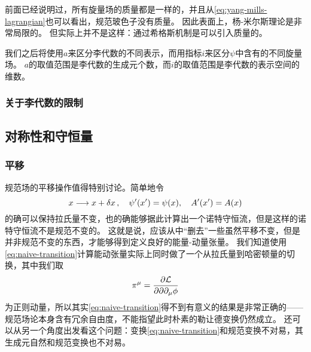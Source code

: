 前面已经说明过，所有旋量场的质量都是一样的，并且从\eqref{eq:yang-mills-lagrangian}也可以看出，规范玻色子没有质量。
因此表面上，杨-米尔斯理论是非常局限的。
但实际上并不是这样：通过希格斯机制是可以引入质量的。

我们之后将使用$a$来区分李代数的不同表示，而用指标$i$来区分$\psi$中含有的不同旋量场。
$a$的取值范围是李代数的生成元个数，而$i$的取值范围是李代数的表示空间的维数。

\subsubsection{关于李代数的限制}


\subsection{对称性和守恒量}

\subsubsection{平移}\label{sec:transition}

规范场的平移操作值得特别讨论。简单地令
\begin{equation}
    x \longrightarrow x + \var{x}, \quad \psi'(x') = \psi(x), \quad A'(x') = A(x)
    \label{eq:naive-transition}
\end{equation}
的确可以保持拉氏量不变，也的确能够据此计算出一个诺特守恒流，但是这样的诺特守恒流不是规范不变的。
这就是说，应该从中“删去”一些虽然平移不变，但是并非规范不变的东西，才能够得到定义良好的能量-动量张量。
我们知道使用\eqref{eq:naive-transition}计算能动张量实际上同时做了一个从拉氏量到哈密顿量的切换，其中我们取
\[
    \pi^\mu = \pdv{\mathcal{L}}{\partial \partial_\mu \phi}
\]
为正则动量，所以其实\eqref{eq:naive-transition}得不到有意义的结果是非常正确的——规范场论本身含有冗余自由度，不能指望此时朴素的勒让德变换仍然成立。
还可以从另一个角度出发看这个问题：变换\eqref{eq:naive-transition}和规范变换不对易，其生成元自然和规范变换也不对易。

